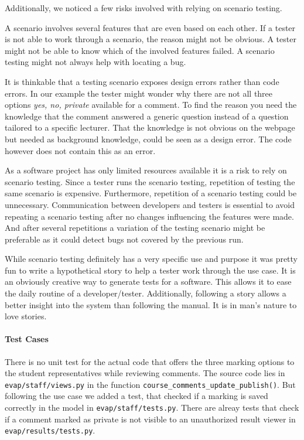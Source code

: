 Additionally, we noticed a few risks involved with relying on scenario testing.

A scenario involves several features that are even based on each other.
If a tester is not able to work through a scenario, the reason might not be obvious.
A tester might not be able to know which of the involved features failed.
A scenario testing might not always help with locating a bug.

It is thinkable that a testing scenario exposes design errors rather than code errors.
In our example the tester might wonder why there are not all three options \emph{yes, no, private} available for a comment. 
To find the reason you need the knowledge that the comment answered a generic question instead of a question tailored to a specific lecturer.
That the knowledge is not obvious on the webpage but needed as background knowledge, could be seen as a design error.
The code however does not contain this as an error.

As a software project has only limited resources available it is a risk to rely on scenario testing.
Since a tester runs the scenario testing, repetition of testing the same scenario is expensive.
Furthermore, repetition of a scenario testing could be unnecessary.
Communication between developers and testers is essential to avoid repeating a scenario testing after no changes influencing the features were made.
And after several repetitions a variation of the testing scenario might be preferable as it could detect bugs not covered by the previous run.

While scenario testing definitely has a very specific use and purpose it was pretty fun to write a hypothetical story to help a tester work through the use case.
It is an obviously creative way to generate tests for a software.
This allows it to ease the daily routine of a developer/tester.
Additionally, following a story allows a better insight into the system than following the manual.
It is in man's nature to love stories.

\paragraph{Test Cases}
There is no unit test for the actual code that offers the three marking options to the student representatives while reviewing comments.
The source code lies in \texttt{evap/staff/views.py} in the function \texttt{course\_comments\_update\_publish()}.
But following the use case we added a test, that checked if a marking is saved correctly in the model in \texttt{evap/staff/tests.py}.
There are alreay tests that check if a comment marked as private is not visible to an unauthorized result viewer in \texttt{evap/results/tests.py}.

